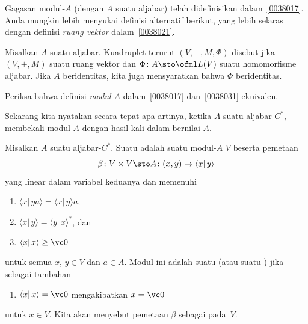 Gagasan modul-$A$ (dengan $A$ suatu aljabar) telah didefinisikan dalam~\ref{0038017}. Anda
mungkin lebih menyukai definisi alternatif berikut, yang lebih selaras dengan
definisi \emph{ruang vektor} dalam~\ref{0038021}.

\begin{defn}\label{0038031} Misalkan $A$ suatu aljabar. Kuadruplet terurut
$(V,+,M,\Phi)$ disebut  jika $(V,+,M)$ suatu ruang vektor dan $\Phi\colon A \sto \ofml L(V)$ suatu
homomorfisme aljabar. Jika $A$ beridentitas, kita juga mensyaratkan bahwa $\Phi$ beridentitas.
\end{defn}

\begin{exer} Periksa bahwa definisi \emph{modul-$A$} dalam~\ref{0038017}
dan~\ref{0038031} ekuivalen.
\end{exer}

Sekarang kita nyatakan secara tepat apa artinya, ketika $A$ suatu aljabar-$C^*$, membekali modul-$A$ dengan
hasil kali dalam bernilai-$A$.

\begin{defn} Misalkan $A$ suatu aljabar-$C^*$. Suatu
 adalah suatu modul-$A$ $V$ beserta pemetaan
  \[ \beta\colon V \times V \sto A\colon (x,y) \mapsto \langle x\vert\, y\rangle \]
yang linear dalam variabel keduanya dan memenuhi
 \begin{enumerate}
    \item[(i)] $\langle x\vert\, ya\rangle = \langle x\vert\, y\rangle a$,
    \item[(ii)] $\langle x\vert\, y\rangle = \langle y\vert\, x\rangle^*$, dan
    \item[(iii)] $\langle x\vert\, x\rangle \ge \vc 0$
 \end{enumerate}
untuk semua $x$, $y \in V$ dan $a \in A$. Modul ini adalah suatu
 (atau suatu
) jika sebagai tambahan
 \begin{enumerate}
    \item[(iv)] $\langle x\vert\, x\rangle = \vc 0$ mengakibatkan $x = \vc 0$
 \end{enumerate}
untuk $x \in V$. Kita akan menyebut pemetaan $\beta$ sebagai
 pada~$V$.
\end{defn}

